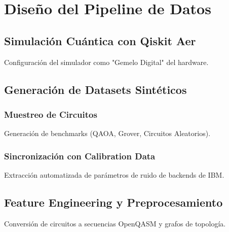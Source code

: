 \chapter{Diseño del Pipeline de Datos}
\label{cap:data}

\section{Simulación Cuántica con Qiskit Aer}
Configuración del simulador como "Gemelo Digital" del hardware.

\section{Generación de Datasets Sintéticos}
\subsection{Muestreo de Circuitos}
Generación de benchmarks (QAOA, Grover, Circuitos Aleatorios).
\subsection{Sincronización con Calibration Data}
Extracción automatizada de parámetros de ruido de backends de IBM.

\section{Feature Engineering y Preprocesamiento}
Conversión de circuitos a secuencias OpenQASM y grafos de topología.
